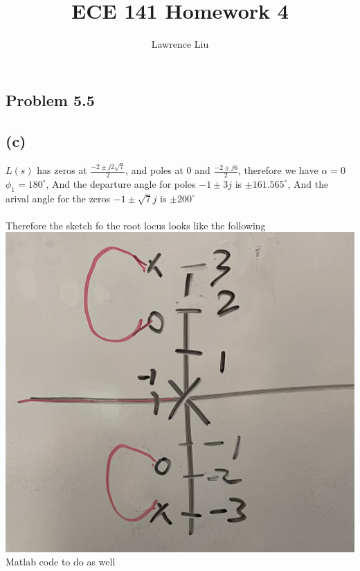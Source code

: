 \documentclass[12pt]{article}
\title{ECE 141 Homework 4}
\author{Lawrence Liu}
\begin{document}
\maketitle
\subsection*{Problem 5.5}
\subsection*{(c)}
$L(s)$ has zeros at $\frac{-2\pm j2\sqrt{7}}{2}$, and poles at $0$ and $\frac{-2\pm j6}{2}$, therefore we have $\alpha=0$
$\phi_{1}=180^{\circ}$, 
And the departure angle for poles $-1\pm3j$ is $\pm161.565^{\circ}$, And the arival angle for the zeros $-1\pm\sqrt{7}j$ is $\pm200^{\circ}$\\\\
Therefore the sketch fo the root locus looks like the following
\\
\includegraphics[scale=.15]{Problem1Sketch1.jpg}
\\Matlab code to do as well
\end{document}
